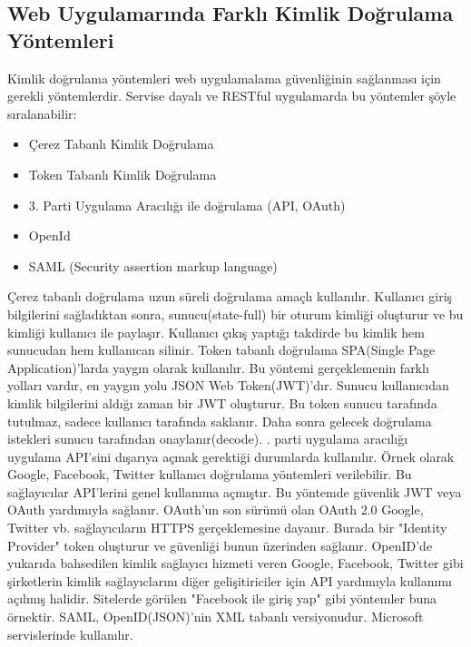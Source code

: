 \subsection{Web Uygulamarında Farklı Kimlik Doğrulama Yöntemleri}
Kimlik doğrulama yöntemleri web uygulamalama güvenliğinin sağlanması için gerekli yöntemlerdir. Servise dayalı ve RESTful uygulamarda bu yöntemler şöyle sıralanabilir:
\begin{itemize}
  \item Çerez Tabanlı Kimlik Doğrulama
  \item Token Tabanlı Kimlik Doğrulama
  \item 3. Parti Uygulama Aracılığı ile doğrulama (API, OAuth)
  \item OpenId
  \item SAML (Security assertion markup language)
\end{itemize}
\noindent
Çerez tabanlı doğrulama uzun süreli doğrulama amaçlı kullanılır. Kullanıcı giriş bilgilerini sağladıktan sonra, sunucu(state-full) bir oturum kimliği oluşturur ve bu kimliği kullanıcı ile paylaşır. Kullanıcı çıkış yaptığı takdirde bu kimlik hem sunucudan hem kullanıcan silinir.
\newline
\newline
\noindent
Token tabanlı doğrulama SPA(Single Page Application)'larda yaygın olarak kullanılır. Bu yöntemi gerçeklemenin farklı yolları vardır, en yaygın yolu JSON Web Token(JWT)'dır. Sunucu kullanıcıdan kimlik bilgilerini aldığı zaman bir JWT oluşturur. Bu token sunucu tarafında tutulmaz, sadece kullanıcı tarafında saklanır. Daha sonra gelecek doğrulama istekleri sunucu tarafından onaylanır(decode).
\newline
\newline
{}. parti uygulama aracılığı uygulama API'sini dışarıya açmak gerektiği durumlarda kullanılır. Örnek olarak Google, Facebook, Twitter kullanıcı doğrulama yöntemleri verilebilir. Bu sağlayıcılar API'lerini genel kullanıma açmıştır. Bu yöntemde güvenlik JWT veya OAuth yardımıyla sağlanır. OAuth'un son sürümü olan OAuth 2.0 Google, Twitter vb. sağlayıcıların HTTPS gerçeklemesine dayanır. Burada bir "Identity Provider" token oluşturur ve güvenliği bunun üzerinden sağlanır.
\newline
\newline
\noindent
OpenID'de yukarıda bahsedilen kimlik sağlayıcı hizmeti veren Google, Facebook, Twitter gibi şirketlerin kimlik sağlayıclarını diğer gelişitiriciler için API yardımıyla kullanımı açılmış halidir. Sitelerde görülen "Facebook ile giriş yap" gibi yöntemler buna örnektir.
\newline
\newline
\noindent
SAML, OpenID(JSON)'nin XML tabanlı versiyonudur. Microsoft servislerinde kullanılır.\cite{auth_medium}
